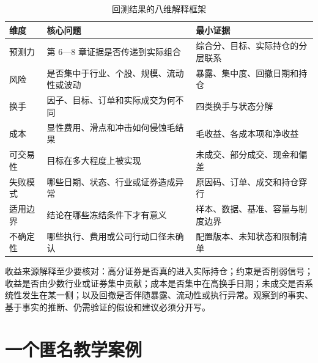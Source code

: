 \begin{table}[htbp]
  \centering
  \small
  \caption{回测结果的八维解释框架}
  \label{tab:ch10-interpretation-framework}
  \begin{tabularx}{\textwidth}{p{2.2cm} p{5.2cm} Y}
    \toprule
    维度 & 核心问题 & 最小证据 \\
    \midrule
    预测力 & 第 6---8 章证据是否传递到实际组合 & 综合分、目标、实际持仓的分层联系 \\
    风险 & 是否集中于行业、个股、规模、流动性或波动 & 暴露、集中度、回撤日期和持仓 \\
    换手 & 因子、目标、订单和实际成交为何不同 & 四类换手与状态分解 \\
    成本 & 显性费用、滑点和冲击如何侵蚀毛结果 & 毛收益、各成本项和净收益 \\
    可交易性 & 目标在多大程度上被实现 & 未成交、部分成交、现金和偏差 \\
    失败模式 & 哪些日期、状态、行业或证券造成异常 & 原因码、订单、成交和持仓穿行 \\
    适用边界 & 结论在哪些冻结条件下才有意义 & 样本、数据、基准、容量与制度边界 \\
    不确定性 & 哪些执行、费用或公司行动口径未确认 & 配置版本、未知状态和限制清单 \\
    \bottomrule
  \end{tabularx}
\end{table}

收益来源解释至少要核对：高分证券是否真的进入实际持仓；约束是否削弱信号；收益是否由少数行业或证券集中贡献；成本是否集中在高换手日期；未成交是否系统性发生在某一侧；以及回撤是否伴随暴露、流动性或执行异常。观察到的事实、基于事实的推断、仍需验证的假设和建议必须分开写。

\section{一个匿名教学案例}

